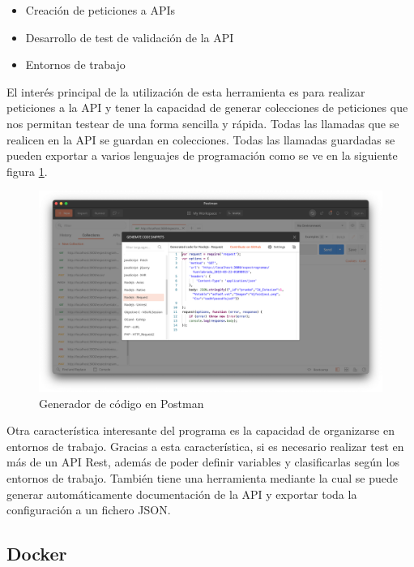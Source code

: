 \begin{itemize}
    \item Creación de peticiones a APIs
    \item Desarrollo de test de validación de la API
    \item Entornos de trabajo
\end{itemize}

El interés principal de la utilización de esta herramienta es para realizar peticiones a la API y tener la capacidad de generar colecciones de peticiones que nos permitan testear de una forma sencilla y rápida.
Todas las llamadas que se realicen en la API se guardan en colecciones. Todas las llamadas guardadas se pueden exportar a varios lenguajes de programación como se ve en la siguiente figura \ref{fig:postman_snippet}.

\begin{figure}[H]
    \centering
    \includegraphics[width=\textwidth]{include/capturas/PostmanSnippet.png}
    \caption{Generador de código en Postman}
    \label{fig:postman_snippet}
\end{figure}

Otra característica interesante del programa es la capacidad de organizarse en entornos de trabajo. Gracias a esta característica, si es necesario realizar test en más de un API Rest, además de poder definir variables y clasificarlas según los entornos de trabajo. También tiene una herramienta mediante la cual se puede generar automáticamente documentación de la API y exportar toda la configuración a un fichero JSON.

\newpage
\subsection{Docker}

